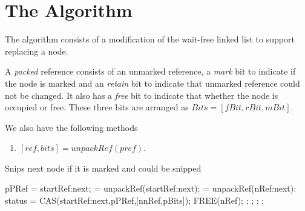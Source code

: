 \documentclass[11pt,onecolumn]{IEEEtran}
\begin{document}
\section{The Algorithm}
The algorithm consists of a modification of the wait-free linked list to support replacing a node.

A {\it packed} reference consists of an unmarked reference, a {\it mark} bit to indicate if the node is marked and an {\it retain} bit to indicate that unmarked reference could not be changed. It also has a {\it free} bit to indicate that whether the node is occupied or free. These three bits are arranged as $Bits = [fBit,rBit,mBit]$.

We also have the following methods

\begin{enumerate}
    \item $[ref, bits] = unpackRef(pref)$.
\end{enumerate} 

\begin{algorithm}
  \caption{Snips next node if it is marked and could be snipped}
  \label{alg:snip}
  
  \begin{algorithmic}[1]
      \State pPRef = startRef:next;
       = unpackRef(startRef:next);
         = unpackRef(nRef:next):
          \State status = CAS(startRef:next,pPRef,[nnRef,pBits]);
             \State FREE(nRef);
             \State 
             ;
          \Else
             \State
             ;
          \EndIf
        \Else
          \State
          ;
        \EndIf
      \Else
        \State
        ;
      \EndIf
    \EndFunction
  \end{algorithmic}
\end{algorithm}
\end{document}
